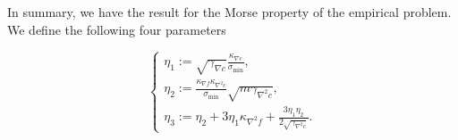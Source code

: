 %

In summary, we have the result for the Morse property of the empirical problem. We define the following four parameters

\[
\begin{cases}
	\eta_1:=\sqrt{\gamma_{\nabla c}}\frac{ \kappa_{\nabla c}}{\sigma_{\min}},\\
	\eta_2:=\tfrac{\kappa_{\nabla f}\kappa_{\nabla^2 c}}{\sigma_{\min}}\sqrt{m\gamma_{\nabla^2 c}},\\
	\eta_3:=\eta_2 +3\eta_1\kappa_{\nabla^2 f}+\frac{3\eta_1\eta_2}{2\sqrt{\gamma_{\nabla^2 c}}}.
\end{cases}
\]

